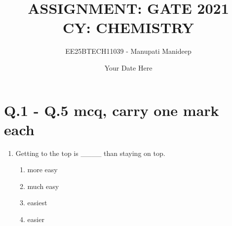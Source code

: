 \documentclass[journal,12pt,onecolumn]{IEEEtran}
\begin{document}
\title{ASSIGNMENT: GATE 2021 \\ CY: CHEMISTRY}
\author{EE25BTECH11039 - Manupati Manideep}
\date{Your Date Here}
\maketitle
\section*{Q.1 - Q.5 mcq, carry one mark each}
\begin{enumerate}
    \item Getting to the top is \_\_\_\_ than staying on top.
    \begin{multicols}{2}
    \begin{enumerate}
        \item more easy
        \item much easy
        \item easiest
        \item easier
    \end{enumerate}
    \end{multicols}
    \hfill{}


\end{enumerate}
\end{document}
